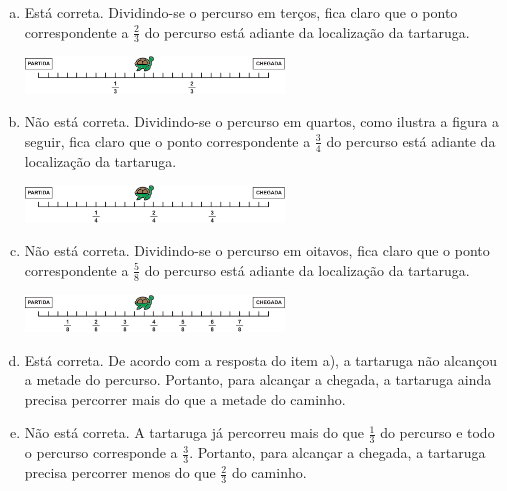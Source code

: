 \begin{multicols}{2}
\begin{solucao}{}{}
\begin{enumerate} [a)]
  \item     Está correta. Dividindo-se o percurso em terços, fica claro que o ponto correspondente a     $\frac{2}{3}$     do percurso está adiante da localização da tartaruga.
    
    \begin{center} \includegraphics[width=195pt, keepaspectratio]{../figuras/licao03/ativ9_resp_f}
    \end{center}
    

  \item     Não está correta. Dividindo-se o percurso em quartos, como ilustra a figura a seguir, fica claro que o ponto correspondente a     $\frac{3}{4}$     do percurso está adiante da localização da tartaruga.
    
\begin{center} \includegraphics[width=195pt, keepaspectratio]{../figuras/licao03/ativ9_resp_g}
\end{center}

\item     Não está correta. Dividindo-se o percurso em oitavos, fica claro que o ponto correspondente a     $\frac{5}{8}$     do percurso está adiante da localização da tartaruga.

  \begin{center}
    \includegraphics[width=195pt, keepaspectratio]{../figuras/licao03/ativ9_resp_h}
\end{center}

  \item     Está correta. De acordo com a resposta do item a), a tartaruga não alcançou a metade do percurso. Portanto, para alcançar a chegada, a tartaruga ainda precisa percorrer mais do que a metade do caminho.

  \item     Não está correta. A tartaruga já percorreu mais do que      $\frac{1}{3}$     do percurso e todo o percurso corresponde a      $\frac{3}{3}$. Portanto, para alcançar a chegada, a tartaruga precisa percorrer menos do que     $\frac{2}{3}$     do caminho.
\end{enumerate} %
\end{solucao}


\end{multicols}
